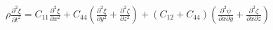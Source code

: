 \documentclass[preview]{standalone}
\begin{document}
\begin{center}
$\rho\frac{\partial^2\xi}{\partial t^2} = C_{11}\frac{\partial^2\xi}{\partial x^2}+
                C_{44}\left( \frac{\partial^2\xi}{\partial y^2}+\frac{\partial^2\zeta}{\partial z^2}\right)+
                (C_{12} + C_{44})\left( \frac{\partial ^2\psi}{\partial x\partial y}+\frac{\partial^2\zeta}{\partial x \partial z}\right)$
\end{center}
\end{document}
